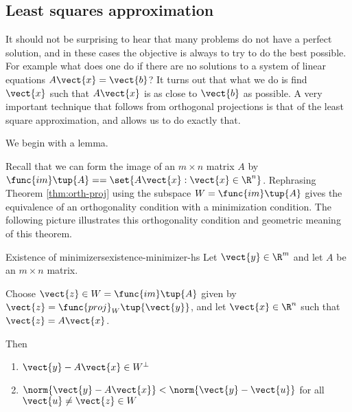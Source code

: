 \subsection{Least squares approximation}

It should not be surprising to hear that many problems do not have a
perfect solution, and in these cases the objective is always to try to
do the best possible. For example what does one do if there are no
solutions to a system of linear equations $A\vect{x}=\vect{b}$? It
turns out that what we do is find $\vect{x}$ such that $A\vect{x}$ is
as close to $\vect{b}$ as possible. A very important technique that
follows from orthogonal projections is that of the least square
approximation, and allows us to do
exactly that.

We begin with a lemma. 

Recall that we can form the image of an $m \times n$ matrix $A$ by
$\func{im}\tup{A} = = \set{A\vect{x} : \vect{x} \in
\R^n }$. Rephrasing Theorem \ref{thm:orth-proj} using
the subspace $W=\func{im}\tup{A}$  gives the
equivalence of an orthogonality condition with a minimization
condition. The following picture
illustrates this orthogonality condition and geometric meaning of this
theorem.

\begin{center}
\end{center}

\begin{theorem}{Existence of minimizers}{existence-minimizer-hs}\label{existence-minimizer-hs}
Let $\vect{y}\in \R^{m}$ and let $A$ be an $m\times n$ matrix.

Choose $\vect{z}\in W= \func{im}\tup{A}$ given by $\vect{z} =
\func{proj}_{W}\tup{\vect{y}}$, and let $\vect{x} \in \R^{n}$ such that $\vect{z}=A\vect{x}$.

Then
\begin{enumerate}
\item $\vect{y} - A\vect{x} \in W^{\perp}$
\item $\norm{\vect{y} - A\vect{x}} < \norm{\vect{y} - \vect{u}}$ for all $\vect{u} \neq \vect{z} \in W$
\end{enumerate}
\end{theorem}

